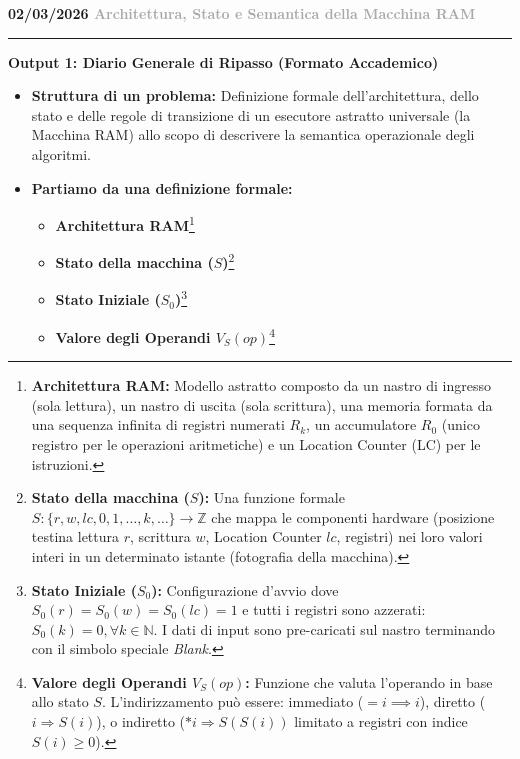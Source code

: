 \documentclass[a4paper, 11pt]{report}
\newcommand{\lezione}[2]{
\vspace{2em}
\noindent\textbf{\Large #1 \hfill \textcolor{darkgray}{#2}}
\vspace{0.5em}
\hrule
\vspace{1.5em}
}
\newcommand{\definizione}[2]{%
\textbf{#1}\footnote{\textbf{#1:} #2}%
}
\begin{document}
\lezione{02/03/2026}{Architettura, Stato e Semantica della Macchina RAM}
\vspace{0.5cm}
\textbf{Output 1: Diario Generale di Ripasso (Formato Accademico)}
\begin{itemize}
\item \textbf{Struttura di un problema:}
Definizione formale dell'architettura, dello stato e delle regole di transizione di un esecutore astratto universale (la Macchina RAM) allo scopo di descrivere la semantica operazionale degli algoritmi.

\item \textbf{Partiamo da una definizione formale:}
\begin{itemize}
    \item \definizione{Architettura RAM}{Modello astratto composto da un nastro di ingresso (sola lettura), un nastro di uscita (sola scrittura), una memoria formata da una sequenza infinita di registri numerati $R_k$, un accumulatore $R_0$ (unico registro per le operazioni aritmetiche) e un Location Counter (LC) per le istruzioni.}
    \item \definizione{Stato della macchina ($S$)}{Una funzione formale $S: \{r, w, lc, 0, 1, \dots, k, \dots\} \to \mathbb{Z}$ che mappa le componenti hardware (posizione testina lettura $r$, scrittura $w$, Location Counter $lc$, registri) nei loro valori interi in un determinato istante (fotografia della macchina).}
    \item \definizione{Stato Iniziale ($S_0$)}{Configurazione d'avvio dove $S_0(r) = S_0(w) = S_0(lc) = 1$ e tutti i registri sono azzerati: $S_0(k) = 0, \forall k \in \mathbb{N}$. I dati di input sono pre-caricati sul nastro terminando con il simbolo speciale \textit{Blank}.}
    \item \definizione{Valore degli Operandi $V_S(op)$}{Funzione che valuta l'operando in base allo stato $S$. L'indirizzamento può essere: immediato ($=i \implies i$), diretto ($i \Rightarrow S(i)$), o indiretto ($*i \Rightarrow S(S(i))$ limitato a registri con indice $S(i) \ge 0$).}
\end{itemize}


\end{itemize}
\end{document}
